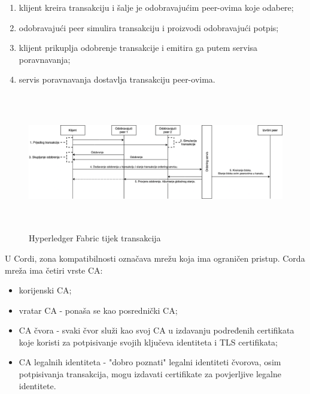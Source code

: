 \documentclass[times, utf8, diplomski]{fer}
\begin{document}
\begin{enumerate}

\item klijent kreira transakciju i šalje je odobravajućim peer-ovima koje odabere;

\item odobravajući peer simulira transakciju i proizvodi odobravajući potpis;

\item klijent prikuplja odobrenje transakcije i emitira ga putem servisa poravnavanja;

\item servis poravnavanja dostavlja transakciju peer-ovima.

\end{enumerate}

\begin{figure}[htb]
\centering
\includegraphics[width=15cm, height=6cm]{imgs/Tx Flow.png}
\caption{Hyperledger Fabric tijek transakcija}
\label{fig:fabrictxflow}
\end{figure}

U Cordi, zona kompatibilnosti označava mrežu koja ima ograničen pristup. Corda mreža ima četiri vrste CA:

\begin{itemize}

\item korijenski CA;

\item vratar CA - ponaša se kao posrednički CA;

\item CA čvora - svaki čvor služi kao svoj CA u izdavanju podređenih certifikata koje koristi za potpisivanje svojih ključeva identiteta i TLS certifikata;

\item CA legalnih identiteta - "dobro poznati" legalni identiteti čvorova, osim potpisivanja transakcija, mogu izdavati certifikate za povjerljive legalne identitete.

\end{itemize}
\end{document}
